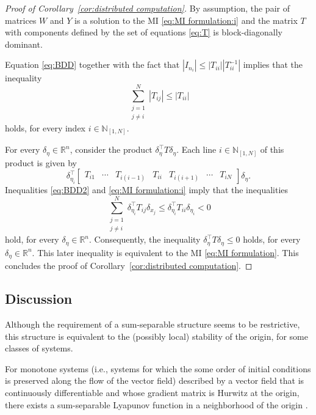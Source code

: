 \documentclass[10pt,twocolumn,twoside]{IEEEtran}
\theoremstyle{plain}
\theoremstyle{definition}
\theoremstyle{remark}
\begin{document}
\begin{proof}[Proof of Corollary~\ref{cor:distributed computation}]
	By assumption, the pair of matrices $W$ and $Y$ is a solution to the MI \eqref{eq:MI formulation:i} and the matrix $T$ with components defined by the set of equations \eqref{eq:T} is block-diagonally dominant.
	
	Equation \eqref{eq:BDD} together with the fact that $|I_{n_i}|\leq |T_{ii}||T_{ii}^{-1}|$ implies that the inequality
	\begin{equation}\label{eq:BDD2} 
		\sum_{\substack{j=1\\ j\neq i}}^N|T_{ij}|\leq |T_{ii}|
	\end{equation}
	holds, for every index $i\in\mathbb{N}_{[1,N]}$.
	
	For every $\delta_\eta\in\mathbb{R}^n$, consider the product $\delta_\eta^\top T\delta_\eta$. Each line $i\in\mathbb{N}_{[1,N]}$ of this product is given by
	\begin{equation*}
		\delta_{\eta_i}^\top\begin{bmatrix}
			T_{i1}&\cdots&T_{i(i-1)}&T_{ii}&T_{i(i+1)}&\cdots&T_{iN}
		\end{bmatrix}\delta_\eta.
	\end{equation*}
	Inequalities \eqref{eq:BDD2} and \eqref{eq:MI formulation:i} imply that the inequalities
	\begin{equation*}
		\sum_{\substack{j=1\\ j\neq i}}^N\delta_{\eta_i}^\top T_{ij}\delta_{x_j}\leq \delta_{\eta_i}^\top T_{ii}\delta_{\eta_i}< 0
	\end{equation*}
	hold, for every $\delta_\eta\in\mathbb{R}^n$. Consequently, the inequality $\delta_\eta^\top T\delta_\eta\leq 0$ holds, for every $\delta_\eta\in\mathbb{R}^n$. This later inequality is equivalent to the MI \eqref{eq:MI formulation}. This concludes the proof of Corollary~\ref{cor:distributed computation}.
\end{proof}

\subsection{Discussion}

Although the requirement of a sum-separable structure seems to be restrictive, this structure is equivalent to the (possibly local) stability of the origin, for some classes of systems.

For monotone systems (i.e., systems for which the some order of initial conditions is preserved along the flow of the vector field) described by a vector field that is continuously differentiable and whose gradient matrix is Hurwitz at the origin, there exists a sum-separable Lyapunov function in a neighborhood of the origin \cite[Theorem 3.4]{Dirr2015}. 
\end{document}
